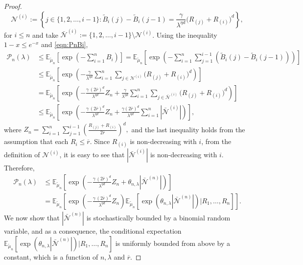 \documentclass[11pt]{article}
\newcommand{\ee}{\mathbb{E}}
\newcommand{\rbdd}{\overline{r}}
\newcommand{\lt}{\left}
\newcommand{\rt}{\right}
\newcommand{\wt}{\widetilde}
\newcommand{\pnon}{\mathcal{P}_n(\lambda)}
\begin{document}
\begin{appendices}
\begin{proof}
$$\displaystyle {\mathscr N}^{(i)} := \left\{ j \in \{1, 2,\dots, i - 1\}: \wt{B}_i(j) - \wt{B}_i({j-1}) =  \frac{\gamma}{\lambda^{\eta d}} \Big(R_{(j)} + R_{(i)}\Big)^d\right\},$$ for $ i \leq n$ and take $\bar{\mathscr N}^{(i)} := \{1,2,\dots, i -1\} \setminus{\mathscr N}^{(i)}$.
Using the inequality $1 - x \leq e^{-x}$ and \eqref{eqn:PnBi},
\begin{align*}
\pnon  &\leq \ee_{\wt \mu_n}\left[  \exp\left(-\sum_{i=1}^{n} B_{i}\right)\right]
    = \ee_{\wt \mu_n}\left[  \exp\left(-\sum_{i=1}^{n} \sum_{j = 1}^{i-1} \lt(\wt{B}_{i}( j) - \wt{B}_{i}( j-1)\rt) \right)\right]\nonumber\\
    &\leq \ee_{\wt \mu_n}\left[  \exp\left(-\frac{\gamma}{\lambda^{\eta d}}\sum_{i=1}^{n} \sum_{j \in {\mathscr N}^{(i)}} \Big(R_{(j)} + R_{(i)}\Big)^d \right)\right]\nonumber\\
    &= \ee_{\wt \mu_n}\left[  \exp\left( - \frac{\gamma\,(2\rbdd)^d}{\lambda^{\eta d}}Z_n +\frac{\gamma }{\lambda^{\eta d}}\sum_{i=1}^{n} \sum_{j \in \bar{\mathscr N}^{(i)}} \Big(R_{(j)} + R_{(i)}\Big)^d \right)\right]\nonumber\\
    &\leq \ee_{\wt \mu_n}\left[  \exp\left( - \frac{\gamma\,(2\rbdd)^d}{\lambda^{\eta d}}Z_n +\frac{\gamma (2\rbdd)^d}{\lambda^{\eta d}}\sum_{i=1}^{n} |\bar{\mathscr N}^{(i)}| \right)\right],\nonumber
\end{align*}
where $Z_n = \sum_{i =1}^{n} \sum_{j = 1}^{i-1} \lt(\frac{R_{(j)} + R_{(i)}}{2\rbdd}\rt)^d,$
and the last inequality holds from the assumption that each $R_i \leq \rbdd$.
Since $R_{(i)}$ is non-decreasing with $i$, from the definition of ${\mathscr N}^{(i)}$, it is easy to see that $|\bar{\mathscr N}^{(i)}|$ is {non-decreasing} with $i$. Therefore, 
\begin{align*}
\pnon  &\leq \ee_{\wt \mu_n}\left[  \exp\left( - \frac{\gamma\,(2\rbdd)^d}{\lambda^{\eta d}}Z_n +\theta_{n, \lambda} |\bar{\mathscr N}^{(n)}| \right)\right]\\
           &= \ee_{\wt \mu_n}\left[  \exp\left( - \frac{\gamma\,(2\rbdd)^d}{\lambda^{\eta d}}Z_n \right)\ee_{\wt \mu_n}\left[ \exp\left(\theta_{n, \lambda} |\bar{\mathscr N}^{(n)}| \right) \Big| R_1, \dots, R_n \right] \right].
\end{align*}
We now show that $|\bar{\mathscr N}^{(n)}|$ is stochastically bounded by a binomial random variable, and as a consequence, the conditional expectation $\ee_{\wt \mu_n}\left[ \exp\left(\theta_{n, \lambda} |\bar{\mathscr N}^{(n)}| \right) \Big| R_1, \dots, R_n \right] $ is uniformly bounded from above by a constant, which is {a function} of $n, \lambda$ and $\rbdd$.

\end{proof}
\end{appendices}
\end{document}
